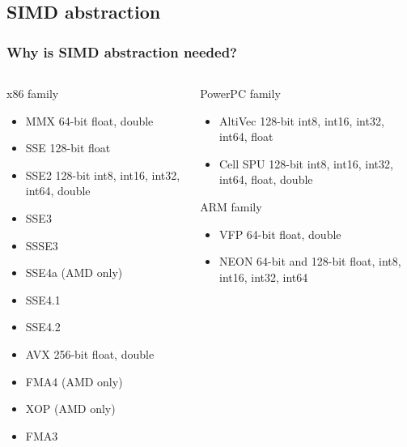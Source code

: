 \subsection{SIMD abstraction}
\frame
{
\frametitle{Why is SIMD abstraction needed?}

  \begin{columns}[c] 
  \begin{column}{5cm} 
  \begin{block}{x86 family}
   \begin{itemize} \footnotesize
			\item MMX 64-bit float, double
			\item SSE 128-bit float
			\item SSE2 128-bit int8, int16, int32, int64, double
			\item SSE3
			\item SSSE3
			\item SSE4a (AMD only)
			\item SSE4.1
			\item SSE4.2
			\item AVX 256-bit float, double
			\item FMA4 (AMD only)
			\item XOP (AMD only)
			\item FMA3
		\end{itemize}
\end{block}{}

  \end{column} 
  \begin{column}{5cm} 
\begin{block}{PowerPC family}
   \begin{itemize} \footnotesize	
			\item AltiVec 128-bit int8, int16, int32, int64, float
			\item Cell SPU 128-bit int8, int16, int32, int64, float, double
		\end{itemize}
\end{block}{}
		
\begin{block}{ARM family}
   \begin{itemize} \footnotesize	
			\item VFP 64-bit float, double
			\item NEON 64-bit and 128-bit float, int8, int16, int32, int64
		\end{itemize}
\end{block}{}
	
  \end{column} 
  \end{columns} 
}

